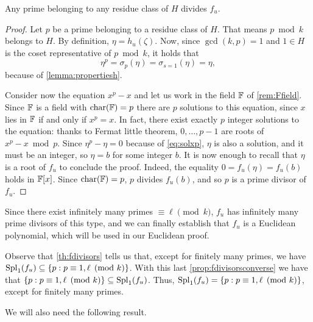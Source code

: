 \documentclass[../main.tex]{subfiles}
\begin{document}
\begin{proposition}\label{prop:fdivisorsconverse}
	Any prime belonging to any residue class of $H$ divides $f_u$.
\end{proposition}
\begin{proof}
	Let $p$ be a prime belonging to a residue class of $H$. That means $p \bmod{k}$ belongs to $H$. By definition, $\eta=h_u(\zeta)$. Now, since $\gcd(k, p)=1$ and $1\in H$ is the coset representative of $p \bmod{k}$, it holds that
	\begin{equation}\label{eq:solxp}
		\eta^p=\sigma_p(\eta)=\sigma_{s=1}(\eta)=\eta,
	\end{equation}
	because of \cref{lemma:propertiesh}.
	
	Consider now the equation $x^p-x$ and let us work in the field $\mathbb{F}$ of \cref{rem:Ffield}. Since $\mathbb{F}$ is a field with $\operatorname{char}(\mathbb{F})=p$ there are $p$ solutions to this equation, since $x$ lies in $\mathbb{F}$ if and only if $x^p=x$. In fact, there exist exactly $p$ integer solutions to the equation: thanks to Fermat little theorem, $0,\dots,p-1$ are roots of $x^p-x \bmod{p}$. Since $\eta^p-\eta=0$ because of \cref{eq:solxp}, $\eta$ is also a solution, and it must be an integer, so $\eta=b$ for some integer $b$. It is now enough to recall that $\eta$ is a root of $f_u$ to conclude the proof. Indeed, the equality $0=f_u(\eta)=f_u(b)$ holds in $\mathbb{F}[x]$. Since $\operatorname{char}(\mathbb{F})=p$, $p$ divides $f_u(b)$, and so $p$ is a prime divisor of $f_u$.
\end{proof}

Since there exist infinitely many primes $\equiv\ell\pmod{k}$, $f_u$ has infinitely many prime divisors of this type, and we can finally establish that $f_u$ is a Euclidean polynomial, which will be used in our Euclidean proof.

\begin{remark}\label{remark:trueprimedivf}
	Observe that \cref{th:fdivisors} tells us that, except for finitely many primes, we have $\operatorname{Spl}_1(f_u)\subseteq\{p: p\equiv 1,\ell\pmod{k}\}$. With this last \cref{prop:fdivisorsconverse} we have that $\{p: p\equiv 1,\ell\pmod{k}\}\subseteq\operatorname{Spl}_1(f_u)$. Thus, $\operatorname{Spl}_1(f_u)=\{p: p\equiv 1,\ell\pmod{k}\}$, except for finitely many primes.
\end{remark}

We will also need the following result.
\end{document}
